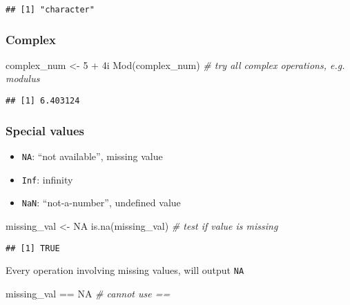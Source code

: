 \documentclass[
  oneside]{book}
\newenvironment{Shaded}{\begin{snugshade}}{\end{snugshade}}
\newcommand{\CommentTok}[1]{\textcolor[rgb]{0.56,0.35,0.01}{\textit{#1}}}
\newcommand{\ConstantTok}[1]{\textcolor[rgb]{0.00,0.00,0.00}{#1}}
\newcommand{\DecValTok}[1]{\textcolor[rgb]{0.00,0.00,0.81}{#1}}
\newcommand{\FunctionTok}[1]{\textcolor[rgb]{0.00,0.00,0.00}{#1}}
\newcommand{\NormalTok}[1]{#1}
\newcommand{\OtherTok}[1]{\textcolor[rgb]{0.56,0.35,0.01}{#1}}
\newcommand{\SpecialCharTok}[1]{\textcolor[rgb]{0.00,0.00,0.00}{#1}}
\providecommand{\tightlist}{%
  \setlength{\itemsep}{0pt}\setlength{\parskip}{0pt}}
\begin{document}
\begin{verbatim}
## [1] "character"
\end{verbatim}

\hypertarget{complex}{%
\subsubsection{Complex}\label{complex}}

\begin{Shaded}
\begin{Highlighting}[]
\NormalTok{complex\_num }\OtherTok{\textless{}{-}} \DecValTok{5} \SpecialCharTok{+}\NormalTok{ 4i}
\FunctionTok{Mod}\NormalTok{(complex\_num) }\CommentTok{\# try all complex operations, e.g. modulus}
\end{Highlighting}
\end{Shaded}

\begin{verbatim}
## [1] 6.403124
\end{verbatim}

\hypertarget{special-values}{%
\subsubsection{Special values}\label{special-values}}

\begin{itemize}
\tightlist
\item
  \texttt{NA}: ``not available'', missing value
\item
  \texttt{Inf}: infinity
\item
  \texttt{NaN}: ``not-a-number'', undefined value
\end{itemize}

\begin{Shaded}
\begin{Highlighting}[]
\NormalTok{missing\_val }\OtherTok{\textless{}{-}} \ConstantTok{NA}
\FunctionTok{is.na}\NormalTok{(missing\_val) }\CommentTok{\# test if value is missing}
\end{Highlighting}
\end{Shaded}

\begin{verbatim}
## [1] TRUE
\end{verbatim}

Every operation involving missing values, will output \texttt{NA}

\begin{Shaded}
\begin{Highlighting}[]
\NormalTok{missing\_val }\SpecialCharTok{==} \ConstantTok{NA} \CommentTok{\# cannot use ==}
\end{Highlighting}
\end{Shaded}
\end{document}
